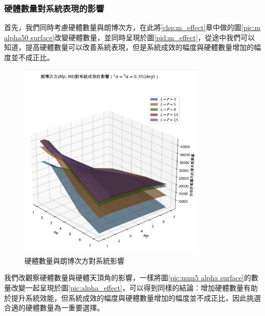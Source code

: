 

\newpage


\subsubsection{硬體數量對系統表現的影響}
\label{chp:amount_effect}

首先，我們同時考慮硬體數量與朗博次方，在此將\ref{chp:m_effect}章中做的圖\ref{pic:m alpha50 surface}改變硬體數量，並同時呈現於圖\ref{pid:m_effect}，從途中我們可以知道，提高硬體數量可以改善系統表現，但是系統成效的幅度與硬體數量增加的幅度並不成正比。

\begin{figure}[htpb]
    \centering
    \includegraphics[width=9cm]{ch4pic/m_effect.png}
    \caption{硬體數量與朗博次方對系統影響}
    \label{pic:m_effect}
\end{figure}

我們改觀察硬體數量與硬體天頂角的影響，一樣將圖\ref{pic:num5 alpha surface}的數量改變一起呈現於圖\ref{pic:alpha_effect}，可以得到同樣的結論：增加硬體數量有助於提升系統效能，但系統成效的幅度與硬體數量增加的幅度並不成正比，因此挑選合適的硬體數量為一重要選擇。

